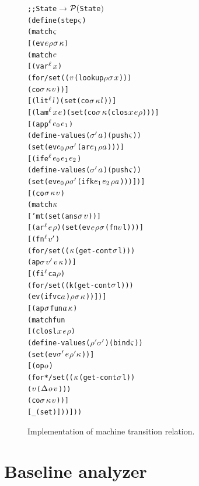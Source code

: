 \documentclass[preprint,onecolumn,9pt]{sigplanconf} %
\begin{document}
\begin{figure}
\begin{alltt}
  ;; State \(\to\) \(\Set(\)State\()\)
  (define (step \(\mstate\))
    (match \(\mstate\)
      [(ev \(\mexp\) \(\rho\) \(\msto\) \(\mkont\))
       (match \(\mexp\)
         [(var\(\superscript\mlab\) \(\mvar\))
          (for/set ((\(\mval\) (lookup \(\rho\) \(\msto\) \(\mvar\))))
            (co \(\msto\) \(\mkont\) \(\mval\)))]
         [(lit\(\superscript\mlab\) \(\mlit\)) (set (co \(\msto\) \(\mkont\) \(\mlit\)))]
         [(lam\(\superscript\mlab\) \(\mvar\) \(\mexp\)) (set (co \(\msto\) \(\mkont\) (clos \(\mvar\) \(\mexp\) \(\rho\))))]
         [(app\(\superscript\mlab\) \(\mexp\subscript0\) \(\mexp\subscript1\))
          (define-values (\(\msto'\) \(\maddr\)) (push \(\mstate\)))
          (set (ev \(\mexp\subscript0\) \(\rho\) \(\msto'\) (ar \(\mexp\subscript1\) \(\rho\) \(\maddr\))))]
         [(ife\(\superscript\mlab\) \(\mexp\subscript0\) \(\mexp\subscript1\) \(\mexp\subscript2\))
          (define-values (\(\msto'\) \(\maddr\)) (push \(\mstate\)))
          (set (ev \(\mexp\subscript0\) \(\rho\) \(\msto'\) (ifk \(\mexp\subscript1\) \(\mexp\subscript2\) \(\rho\) \(\maddr\))))])]
      [(co \(\msto\) \(\mkont\) \(\mval\))
       (match \(\mkont\)
         ['mt (set (ans \(\msto\) \(\mval\)))]
         [(ar\(\superscript\mlab\) \(\mexp\) \(\rho\)) (set (ev \(\mexp\) \(\rho\) \(\msto\) (fn \(\mval\) l)))]
         [(fn\(\superscript\mlab\) \(\mval'\))
          (for/set ((\(\mkont\) (get-cont \(\msto\) l)))
            (ap \(\msto\) \(\mval'\) \(\mval\) \(\mkont\)))]
         [(fi\(\superscript\mlab\) c a \(\rho\))
          (for/set ((k (get-cont \(\msto\) l)))
            (ev (if v c \(\maddr\)) \(\rho\) \(\msto\) \(\mkont\)))])]
      [(ap \(\msto\) fun \(\maddr\) \(\mkont\))
       (match fun
         [(clos l \(\mvar\) \(\mexp\) \(\rho\))
          (define-values (\(\rho'\) \(\msto'\)) (bind \(\mstate\)))
          (set (ev \(\msto'\) \(\mexp\) \(\rho'\) \(\mkont\)))]
         [(op \(\mop\))
          (for*/set ((\(\mkont\) (get-cont \(\msto\) l))
                     (\(\mval\) (\(\interpdelta\) \(\mop\) \(\mval\))))
            (co \(\msto\) \(\mkont\) \(\mval\)))]
         [_ (set)]))]))
\end{alltt}
\caption{Implementation of machine transition relation.}
\end{figure}



\newpage
\section{Baseline analyzer}
\label{sec:baseline}
\end{document}
